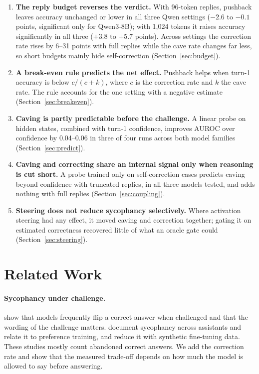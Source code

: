 \begin{enumerate}
  \item \textbf{The reply budget reverses the verdict.} With 96-token replies, pushback leaves accuracy unchanged or lower in all three Qwen settings ($-2.6$ to $-0.1$ points, significant only for Qwen3-8B); with 1{,}024 tokens it raises accuracy significantly in all three ($+3.8$ to $+5.7$ points). Across settings the correction rate rises by 6--31 points with full replies while the cave rate changes far less, so short budgets mainly hide self-correction (Section~\ref{sec:budget}).
  \item \textbf{A break-even rule predicts the net effect.} Pushback helps when turn-1 accuracy is below $c/(c+k)$, where $c$ is the correction rate and $k$ the cave rate. The rule accounts for the one setting with a negative estimate (Section~\ref{sec:breakeven}).
  \item \textbf{Caving is partly predictable before the challenge.} A linear probe on hidden states, combined with turn-1 confidence, improves AUROC over confidence by 0.04--0.06 in three of four runs across both model families (Section~\ref{sec:predict}).
  \item \textbf{Caving and correcting share an internal signal only when reasoning is cut short.} A probe trained only on self-correction cases predicts caving beyond confidence with truncated replies, in all three models tested, and adds nothing with full replies (Section~\ref{sec:coupling}).
  \item \textbf{Steering does not reduce sycophancy selectively.} Where activation steering had any effect, it moved caving and correction together; gating it on estimated correctness recovered little of what an oracle gate could (Section~\ref{sec:steering}).
\end{enumerate}

\section{Related Work}

\paragraph{Sycophancy under challenge.}
\citet{laban2023flipflop} show that models frequently flip a correct answer when challenged and that the wording of the challenge matters. \citet{sharma2023sycophancy} document sycophancy across assistants and relate it to preference training, and \citet{wei2023synthetic} reduce it with synthetic fine-tuning data. These studies mostly count abandoned correct answers. We add the correction rate and show that the measured trade-off depends on how much the model is allowed to say before answering.

